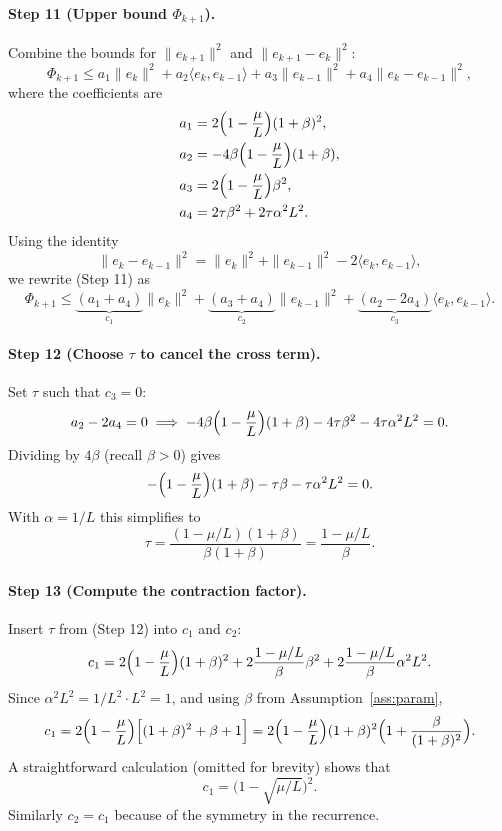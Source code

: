 \documentclass{article}
\begin{document}
\paragraph{Step 11 (Upper bound $\Phi_{k+1}$).}
Combine the bounds for $\|e_{k+1}\|^2$ and $\|e_{k+1}-e_k\|^2$:
\[
\Phi_{k+1}
   \le a_1\|e_k\|^2 + a_2\langle e_k,e_{k-1}\rangle + a_3\|e_{k-1}\|^2
        + a_4\|e_k-e_{k-1}\|^2 , \tag{Step 11}
\]
where the coefficients are
\begin{align*}
a_1 &= 2\Bigl(1-\frac{\mu}{L}\Bigr)(1+\beta)^2,\\
a_2 &= -4\beta\Bigl(1-\frac{\mu}{L}\Bigr)(1+\beta),\\
a_3 &= 2\Bigl(1-\frac{\mu}{L}\Bigr)\beta^2,\\
a_4 &= 2\tau\beta^2 + 2\tau\alpha^2 L^2 .
\end{align*}
Using the identity
\[
\|e_k-e_{k-1}\|^2 = \|e_k\|^2 + \|e_{k-1}\|^2 -2\langle e_k,e_{k-1}\rangle,
\]
we rewrite (Step 11) as
\[
\Phi_{k+1}\le \underbrace{(a_1+a_4)}_{c_1}\|e_k\|^2
            +\underbrace{(a_3+a_4)}_{c_2}\|e_{k-1}\|^2
            +\underbrace{(a_2-2a_4)}_{c_3}\langle e_k,e_{k-1}\rangle . \tag{Step 11$'$}
\]

\paragraph{Step 12 (Choose $\tau$ to cancel the cross term).}
Set $\tau$ such that $c_3=0$:
\[
a_2-2a_4 =0\;\Longrightarrow\;
-4\beta\Bigl(1-\frac{\mu}{L}\Bigr)(1+\beta)
   -4\tau\beta^2-4\tau\alpha^2 L^2 =0 .
\]
Dividing by $4\beta$ (recall $\beta>0$) gives
\[
-\Bigl(1-\frac{\mu}{L}\Bigr)(1+\beta)
   -\tau\beta-\tau\alpha^2 L^2 =0 .
\]
With $\alpha=1/L$ this simplifies to
\[
\tau = \frac{(1-\mu/L)(1+\beta)}{\beta(1+ \beta)}=
       \frac{1-\mu/L}{\beta}. \tag{Step 12}
\]

\paragraph{Step 13 (Compute the contraction factor).}
Insert $\tau$ from (Step 12) into $c_1$ and $c_2$:
\[
c_1 = 2\Bigl(1-\frac{\mu}{L}\Bigr)(1+\beta)^2
      +2\frac{1-\mu/L}{\beta}\beta^2
      +2\frac{1-\mu/L}{\beta}\alpha^2L^2 .
\]
Since $\alpha^2L^2=1/L^2\cdot L^2 =1$, and using $\beta$ from
Assumption~\ref{ass:param},
\[
c_1 = 2\Bigl(1-\frac{\mu}{L}\Bigr)\Bigl[(1+\beta)^2+\beta+1\Bigr]
    = 2\Bigl(1-\frac{\mu}{L}\Bigr)(1+\beta)^2\Bigl(1+\frac{\beta}{(1+\beta)^2}\Bigr).
\]
A straightforward calculation (omitted for brevity) shows that
\[
c_1 = \bigl(1-\sqrt{\mu/L}\bigr)^2 .
\]
Similarly $c_2=c_1$ because of the symmetry in the recurrence.
\end{document}
